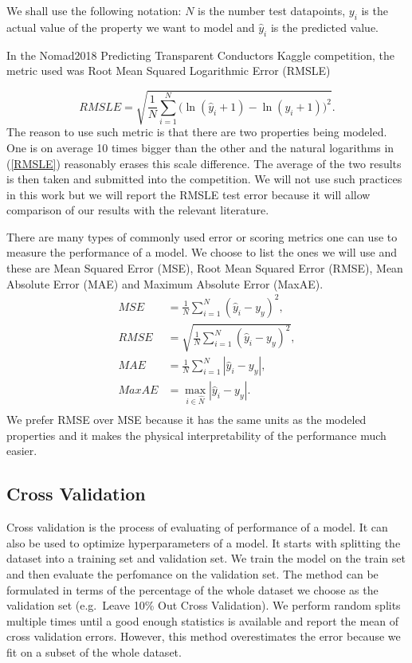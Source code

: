 \documentclass[11pt,oneside,czech,american]{book} %
\theoremstyle{definition} %
\theoremstyle{definition}
\begin{document}
We shall use the following notation: $N$ is the number test datapoints, $y_i$ is the actual value of the property we want to model and $\hat{y}_i$ is the predicted value.

In the Nomad2018 Predicting Transparent Conductors Kaggle competition, the metric used was Root Mean Squared Logarithmic Error (RMSLE) \parencite{sutton19}

\begin{equation}
	RMSLE = \sqrt{\frac{1}{N} \sum_{i=1}^{N} \Big(\ln(\hat{y}_i+ 1) - \ln(y_i+ 1)\Big)^2}.
	\label{RMSLE}
\end{equation}
The reason to use such metric is that there are two properties being modeled. One is on average 10 times bigger than the other and the natural logarithms in (\ref{RMSLE}) reasonably erases this scale difference. The average of the two results is then taken and submitted into the competition. We will not use such practices in this work but we will report the RMSLE test error because it will allow comparison of our results with the relevant literature.

There are many types of commonly used error or scoring metrics one can use to measure the performance of a model. We choose to list the ones we will use and these are Mean Squared Error (MSE), Root Mean Squared Error (RMSE), Mean Absolute Error (MAE) and Maximum Absolute Error (MaxAE).
\begin{equation}
	\begin{aligned}
	MSE &= \frac{1}{N} \sum_{i=1}^{N}(\hat{y}_i - y_y)^2, \\
	RMSE &= \sqrt{\frac{1}{N} \sum_{i=1}^{N}(\hat{y}_i - y_y)^2}, \\
	MAE &= \frac{1}{N} \sum_{i=1}^{N}|\hat{y}_i - y_y|, \\
	MaxAE &= \max_{i \in \hat{N}}|\hat{y}_i - y_y|. \\
\end{aligned}
\label{errors}
\end{equation}
We prefer RMSE over MSE because it has the same units as the modeled properties and it makes the physical interpretability of the performance much easier.
\subsection{Cross Validation}
Cross validation is the process of evaluating of performance of a model. It can also be used to optimize hyperparameters of a model. It starts with splitting the dataset into a training set and validation set. We train the model on the train set and then evaluate the perfomance on the validation set. The method can be formulated in terms of the percentage of the whole dataset we choose as the validation set (e.g.\ Leave 10\% Out Cross Validation). We perform random splits multiple times until a good enough statistics is available and report the mean of cross validation errors. However, this method overestimates the error because we fit on a subset of the whole dataset.
\end{document}
